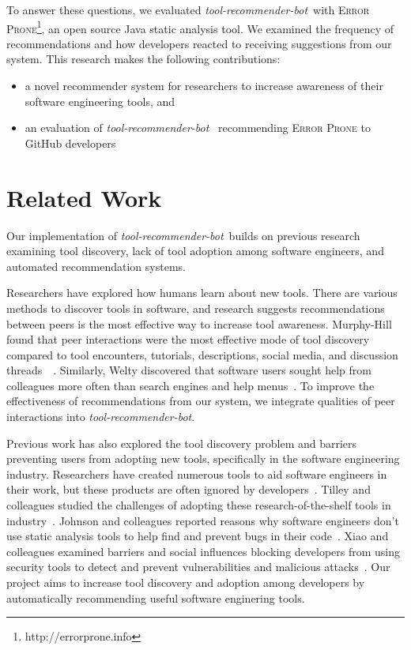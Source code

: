 \documentclass[sigconf,review,anonymous]{acmart}
\newcommand{\tool}{\textsl{tool-recommender-bot}}
\begin{document}
To answer these questions, we evaluated \tool~with \textsc{Error Prone}\footnote{http://errorprone.info}, an open source Java static analysis tool. We examined the frequency of recommendations and how developers reacted to receiving suggestions from our system. This research makes the following contributions:

\begin{itemize}
 \item a novel recommender system for researchers to increase awareness of their software engineering tools, and
 \item an evaluation of \tool~ recommending \textsc{Error Prone} to GitHub developers
 \end{itemize}

\section{Related Work}
Our implementation of \tool~builds on previous research examining tool discovery, lack of tool adoption among software engineers, and automated recommendation systems.

Researchers have explored how humans learn about new tools. There are various methods to discover tools in software, and research suggests recommendations between peers is the most effective way to increase tool awareness. Murphy-Hill found that peer interactions were the most effective mode of tool discovery compared to tool encounters, tutorials, descriptions, social media, and discussion threads~\cite{MurphyHill2011PeerInteraction}~\cite{Murphy-Hill2015HowDoUsers}. Similarly, Welty discovered that software users sought help from colleagues more often than search engines and help menus~\cite{Welty2011Help}. To improve the effectiveness of recommendations from our system, we integrate qualities of peer interactions into \tool.

Previous work has also explored the tool discovery problem and barriers preventing users from adopting new tools, specifically in the software engineering industry. Researchers have created numerous tools to aid software engineers in their work, but these products are often ignored by developers~\cite{Ivanov2017Gaps}. Tilley and colleagues studied the challenges of adopting these research-of-the-shelf tools in industry~\cite{Tilley2003ROTS}. Johnson and colleagues reported reasons why software engineers don't use static analysis tools to help find and prevent bugs in their code~\cite{Johnson2013Why}. Xiao and colleagues examined barriers and social influences blocking developers from using security tools to detect and prevent vulnerabilities and malicious attacks~\cite{Xiao2014Security}. Our project aims to increase tool discovery and adoption among developers by automatically recommending useful software enginering tools.
\end{document}
